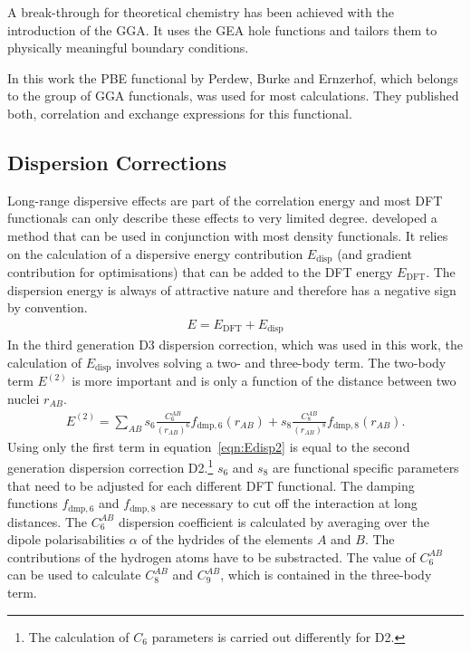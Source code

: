A break-through for theoretical chemistry has been achieved with the
introduction of the \ac{GGA}. It uses the \ac{GEA} hole functions and tailors
them to physically meaningful boundary conditions. 

In this work the PBE functional by Perdew, Burke and Ernzerhof\autocite{Perdew_GeneralizedGradientApproximation_1996,Perdew_GeneralizedGradientApproximation_1997},
which belongs to the group of \ac{GGA} functionals, was used for most
calculations. They published both, correlation and exchange expressions for
this functional.

\subsection{Dispersion Corrections}
\label{sec:dispersioncorrections}

Long-range dispersive effects are part of the correlation energy and most
\ac{DFT} functionals can only describe these effects to very limited degree.
\citeauthor{Grimme_consistentaccurateinitio_2010} developed a method that can
be used in conjunction with most density
functionals.\autocite{Grimme_consistentaccurateinitio_2010} It relies on the
calculation of a dispersive energy contribution $E_\text{disp}$ (and gradient
contribution for optimisations) that can be added to the \ac{DFT} energy
$E_\text{DFT}$. The dispersion energy is always of attractive nature and
therefore has a negative sign by convention.
%
\begin{align}
	E = E_\text{DFT} + E_\text{disp}
\end{align}
%
In the third generation D3 dispersion correction, which was used in this work,
the calculation of $E_\text{disp}$ involves solving a two- and three-body term.
The two-body term $E^{(2)}$ is more important and is only a function of the
distance between two nuclei $r_{AB}$.
%
\begin{align}
	E^{(2)}=\sum\limits_{AB}s_6\frac{C_6^{AB}}{\left(r_{AB}\right)^6}f_{\text{dmp},6}(r_{AB}) + s_8\frac{C_8^{AB}}{\left(r_{AB}\right)^8}f_{\text{dmp},8}(r_{AB}).\label{eqn:Edisp2}
\end{align}
%
Using only the first term in equation~\eqref{eqn:Edisp2} is equal to the
second generation dispersion correction D2.\footnote{The calculation of $C_6$
parameters is carried out differently for D2.} $s_6$ and $s_8$ are functional
specific parameters that need to be adjusted for each different \ac{DFT}
functional. The damping functions $f_{\text{dmp},6}$ and $f_{\text{dmp},8}$ are
necessary to cut off the interaction at long distances. The $C_6^{AB}$
dispersion coefficient is calculated by averaging over the dipole
polarisabilities $\alpha$ of the hydrides of the elements $A$ and $B$. The
contributions of the hydrogen atoms have to be substracted. The value of
$C_6^{AB}$ can be used to calculate $C_8^{AB}$ and $C_9^{AB}$, which is
contained in the three-body term.


